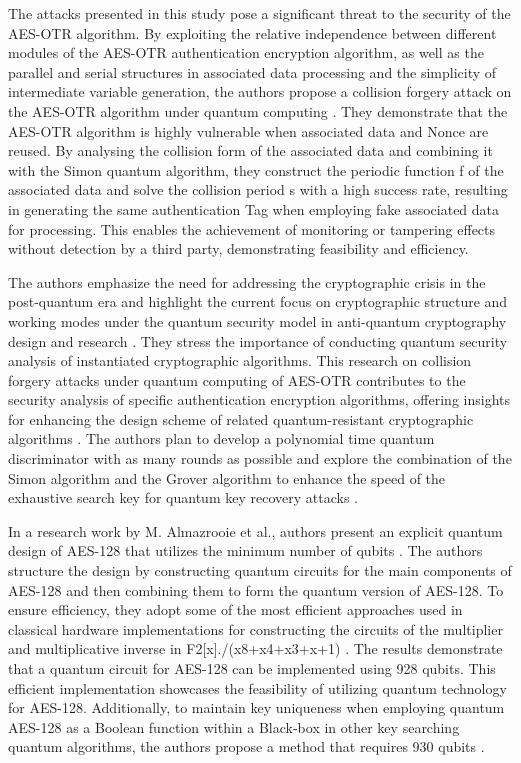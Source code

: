 The attacks presented in this study pose a significant threat to the security of the AES-OTR algorithm. By exploiting the relative independence between different modules of the AES-OTR authentication encryption algorithm, as well as the parallel and serial structures in associated data processing and the simplicity of intermediate variable generation, the authors propose a collision forgery attack on the AES-OTR algorithm under quantum computing \cite{chang2022collision}. They demonstrate that the AES-OTR algorithm is highly vulnerable when associated data and Nonce are reused. By analysing the collision form of the associated data and combining it with the Simon quantum algorithm, they construct the periodic function f of the associated data and solve the collision period s with a high success rate, resulting in generating the same authentication Tag when employing fake associated data for processing. This enables the achievement of monitoring or tampering effects without detection by a third party, demonstrating feasibility and efficiency. 


The authors emphasize the need for addressing the cryptographic crisis in the post-quantum era and highlight the current focus on cryptographic structure and working modes under the quantum security model in anti-quantum cryptography design and research \cite{chen2016postquantum}\cite{bernstein2009introduction}. They stress the importance of conducting quantum security analysis of instantiated cryptographic algorithms. This research on collision forgery attacks under quantum computing of AES-OTR contributes to the security analysis of specific authentication encryption algorithms, offering insights for enhancing the design scheme of related quantum-resistant cryptographic algorithms \cite{bonnetain2019quantum}. The authors plan to develop a polynomial time quantum discriminator with as many rounds as possible and explore the combination of the Simon algorithm and the Grover algorithm to enhance the speed of the exhaustive search key for quantum key recovery attacks \cite{raghu2015application}\cite{chang2022collision}. 
 

In a research work by M. Almazrooie et al., authors present an explicit quantum design of AES-128 that utilizes the minimum number of qubits \cite{almazrooie2018quantum}. The authors structure the design by constructing quantum circuits for the main components of AES-128 and then combining them to form the quantum version of AES-128. To ensure efficiency, they adopt some of the most efficient approaches used in classical hardware implementations for constructing the circuits of the multiplier and multiplicative inverse in F2[x]./(x8+x4+x3+x+1) \cite{almazrooie2018grover}. The results demonstrate that a quantum circuit for AES-128 can be implemented using 928 qubits. This efficient implementation showcases the feasibility of utilizing quantum technology for AES-128. Additionally, to maintain key uniqueness when employing quantum AES-128 as a Boolean function within a Black-box in other key searching quantum algorithms, the authors propose a method that requires 930 qubits \cite{sharma2023post}\cite{yan2016improved}.
 

